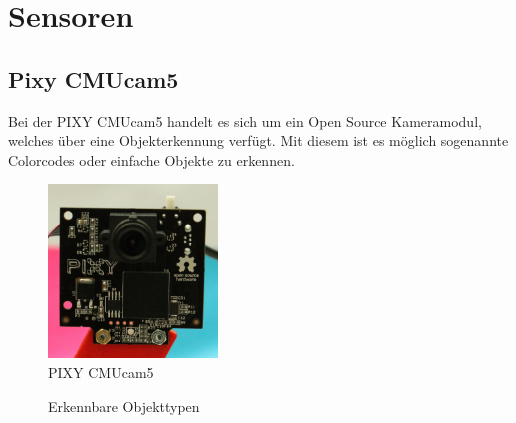 \chapter{Sensoren}
\renewcommand{\kapitelautor}{Autor: Lucas Ullrich}

\section{Pixy CMUcam5}
Bei der PIXY CMUcam5 handelt es sich um ein Open Source Kameramodul, welches über eine Objekterkennung verfügt. Mit diesem ist es möglich sogenannte Colorcodes oder einfache Objekte zu erkennen.

\begin{figure}[H]
  \begin{centering}
    \includegraphics[width = 0.4\textwidth]{Bilder/Pixy_CMUcam5}
  \par\end{centering}
  \caption{PIXY CMUcam5}
  \label{PIXY}
\end{figure}

\begin{figure}[H]
  \begin{centering}
  \par\end{centering}
  \caption{Erkennbare Objekttypen}
  \label{PIXY_Objekte}
\end{figure}

